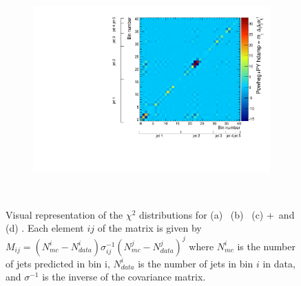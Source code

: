 \begin{figure}
\begin{subfigure}[]{0.45\textwidth}
\end{subfigure}
~
\begin{subfigure}[]{0.45\textwidth}
\includegraphics[width=\textwidth]{fig/DataUnfold/NLOFS/Chi2/110404atlfast.pdf}
\end{subfigure}
~
\caption{Visual representation of the $\chi^2$ distributions for (a) \powpy\ (b) \peight\ (c)  \madgraph +\py\  and \newline (d) \hdamp. Each element $ij$ of the matrix is given by $M_{ij}=(N^{i}_{mc}-N^{i}_{data})\sigma^{-1}_{ij}(N^{j}_{mc}-N^{j}_{data})^{j}$ where $N^{i}_{mc}$ is the number of jets predicted in bin i, $N^{i}_{data}$ is the number of jets in bin $i$ in data, and $\sigma^{-1}$ is the inverse of the covariance matrix.}
\label{fig:chi2}
\end{figure}

